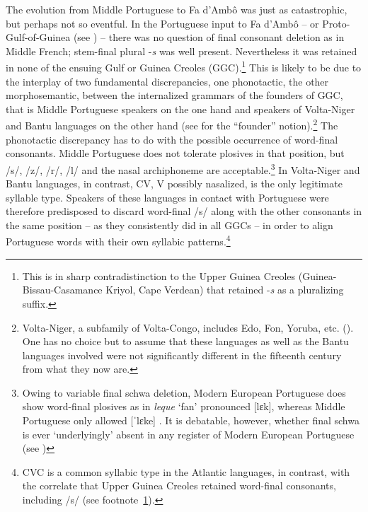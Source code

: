 \documentclass[output=paper]{langscibook}
\begin{document}
The evolution from Middle Portuguese to Fa d’Ambô was just as catastrophic, but perhaps not so eventful. In the Portuguese input to Fa d’Ambô -- or Proto-Gulf-of-Guinea (see \cites[37--38]{HagemeijerOgie2011}{Bandeira2017}{Rougé2018}) -- there was no question of final consonant deletion as in  Middle French; stem-final plural -\textit{s} was well present. Nevertheless it was retained in none of the ensuing Gulf or Guinea Creoles (GGC).\footnote{\label{fn:kihm:29}This is in sharp contradistinction to the Upper Guinea Creoles (Guinea-Bissau-Casamance Kriyol, Cape Verdean) that retained -\textit{s} as a pluralizing suffix.} This is likely to be due to the interplay of two fundamental discrepancies, one phonotactic, the other morphosemantic, between the internalized grammars of the founders of GGC, that is Middle Portuguese speakers on the one hand and speakers of Volta-Niger and Bantu languages on the other hand (see \citealt{Mufwene1996} for the “founder” notion).\footnote{Volta-Niger, a subfamily of Volta-Congo, includes Edo, Fon, Yoruba, etc. (\citealt{WilliamsonBlench2000}). One has no choice but to assume that these languages as well as the Bantu languages involved were not significantly different in the fifteenth century from what they now are.} The phonotactic discrepancy has to do with the possible occurrence of word-final consonants. Middle Portuguese does not tolerate plosives in that position, but /s/, /z/, /r/, /l/ and the nasal archiphoneme are acceptable.\footnote{Owing to variable final schwa deletion, Modern European Portuguese does show word-final plosives as in \textit{leque} ‘fan’ pronounced [lɛk], whereas Middle Portuguese only allowed [ˈlɛke] \citep{Teyssier1980}. It is debatable, however, whether final schwa is ever ‘underlyingly’ absent in any register of Modern European Portuguese (see \citealt[364]{Mateus1989})} In Volta-Niger and Bantu languages, in contrast, CV, V possibly nasalized, is the only legitimate syllable type. Speakers of these languages in contact with Portuguese were therefore predisposed to discard word-final /s/ along with the other consonants in the same position -- as they consistently did in all GGCs -- in order to align Portuguese words with their own syllabic patterns.\footnote{CVC is a common syllabic type in the Atlantic languages, in contrast, with the correlate that Upper Guinea Creoles retained word-final consonants, including /s/ (see footnote~\ref{fn:kihm:29}).}
\end{document}
